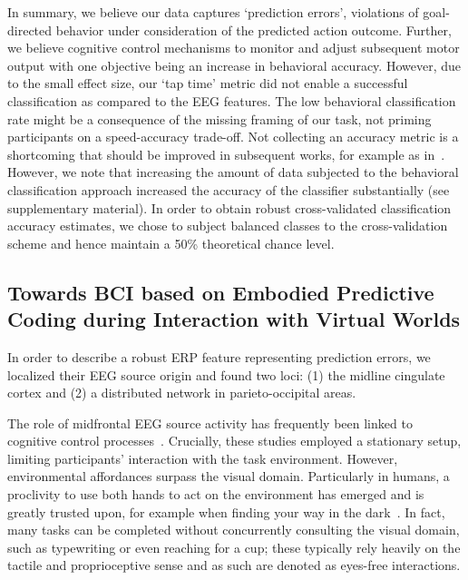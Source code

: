In summary, we believe our data captures `prediction errors', violations of goal-directed behavior under consideration of the predicted action outcome. Further, we believe cognitive control mechanisms to monitor and adjust subsequent motor output with one objective being an increase in behavioral accuracy. However, due to the small effect size, our `tap time' metric did not enable a successful classification as compared to the EEG features. The low behavioral classification rate might be a consequence of the missing framing of our task, not priming participants on a speed-accuracy trade-off. Not collecting an accuracy metric is a shortcoming that should be improved in subsequent works, for example as in~\cite{Purcell2016-li}. However, we note that increasing the amount of data subjected to the behavioral classification approach increased the accuracy of the classifier substantially (see supplementary material). In order to obtain robust cross-validated classification accuracy estimates, we chose to subject balanced classes to the cross-validation scheme and hence maintain a 50\% theoretical chance level.

\subsection{\textcolor{n}{Towards} BCI based on Embodied Predictive Coding during Interaction with Virtual Worlds}

In order to describe a robust ERP feature representing prediction errors, we localized their EEG source origin and found two loci: (1) the midline cingulate cortex and (2) a distributed network in parieto-occipital areas. 

The role of midfrontal EEG source activity has frequently been linked to cognitive control processes~\cite{Ridderinkhof2004-rz, Cavanagh2014-mm, Cooper2019-im}. Crucially, these studies employed a stationary setup, limiting participants' interaction with the task environment. However, environmental affordances surpass the visual domain. Particularly in humans, a proclivity to use both hands to act on the environment has emerged and is greatly trusted upon, for example when finding your way in the dark~\cite{Gehrke2018-jm, Gehrke2021-ml, Miyakoshi2021-ni}. In fact, many tasks can be completed without concurrently consulting the visual domain, such as typewriting or even reaching for a cup; these typically rely heavily on the tactile and proprioceptive sense and as such are denoted as eyes-free interactions.

